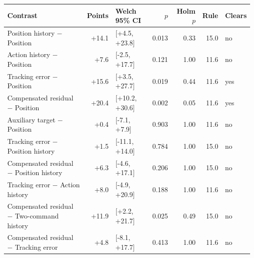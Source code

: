 \begin{tabular}{lrlrrrl}
\toprule
Contrast & Points & Welch 95\% CI & $p$ & Holm $p$ & Rule & Clears \\
\midrule
Position history $-$ Position & +14.1 & [+4.5, +23.8] & 0.013 & 0.33 & 15.0 & no \\
Action history $-$ Position & +7.6 & [-2.5, +17.7] & 0.121 & 1.00 & 11.6 & no \\
Tracking error $-$ Position & +15.6 & [+3.5, +27.7] & 0.019 & 0.44 & 11.6 & yes \\
Compensated residual $-$ Position & +20.4 & [+10.2, +30.6] & 0.002 & 0.05 & 11.6 & yes \\
Auxiliary target $-$ Position & +0.4 & [-7.1, +7.9] & 0.903 & 1.00 & 11.6 & no \\
Tracking error $-$ Position history & +1.5 & [-11.1, +14.0] & 0.784 & 1.00 & 15.0 & no \\
Compensated residual $-$ Position history & +6.3 & [-4.6, +17.1] & 0.206 & 1.00 & 15.0 & no \\
Tracking error $-$ Action history & +8.0 & [-4.9, +20.9] & 0.188 & 1.00 & 11.6 & no \\
Compensated residual $-$ Two-command history & +11.9 & [+2.2, +21.7] & 0.025 & 0.49 & 15.0 & no \\
Compensated residual $-$ Tracking error & +4.8 & [-8.1, +17.7] & 0.413 & 1.00 & 11.6 & no \\
\bottomrule
\end{tabular}

